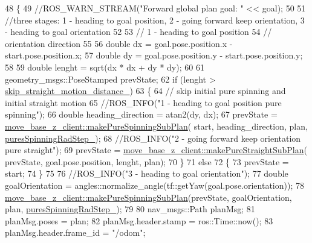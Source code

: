 \begin{DoxyCode}
48 \{
49     \textcolor{comment}{//ROS\_WARN\_STREAM("Forward global plan goal: " << goal);}
50 
51     \textcolor{comment}{//three stages: 1 - heading to goal position, 2 - going forward keep orientation, 3 - heading to goal
       orientation}
52 
53     \textcolor{comment}{// 1 - heading to goal position}
54     \textcolor{comment}{// orientation direction}
55 
56     \textcolor{keywordtype}{double} dx = goal.pose.position.x - start.pose.position.x;
57     \textcolor{keywordtype}{double} dy = goal.pose.position.y - start.pose.position.y;
58 
59     \textcolor{keywordtype}{double} lenght = sqrt(dx * dx + dy * dy);
60 
61     geometry\_msgs::PoseStamped prevState;
62     \textcolor{keywordflow}{if} (lenght > \hyperlink{classmove__base__z__client_1_1forward__global__planner_1_1ForwardGlobalPlanner_ae33082b9dd81dd3ce8d3e68a6c032c61}{skip\_straight\_motion\_distance\_})
63     \{
64         \textcolor{comment}{// skip initial pure spinning and initial straight motion}
65         \textcolor{comment}{//ROS\_INFO("1 - heading to goal position pure spinning");}
66         \textcolor{keywordtype}{double} heading\_direction = atan2(dy, dx);
67         prevState = \hyperlink{namespacemove__base__z__client_a01da021a9b88189c076e8740d5d2dfe5}{move\_base\_z\_client::makePureSpinningSubPlan}(
      start, heading\_direction, plan, \hyperlink{classmove__base__z__client_1_1forward__global__planner_1_1ForwardGlobalPlanner_a91bac0160c7b6ea54f4188b60f7fcf89}{puresSpinningRadStep\_});
68         \textcolor{comment}{//ROS\_INFO("2 - going forward keep orientation pure straight");}
69         prevState = \hyperlink{namespacemove__base__z__client_aeda8dd87896b3e31221df66d02313358}{move\_base\_z\_client::makePureStraightSubPlan}(
      prevState, goal.pose.position, lenght, plan);
70     \}
71     \textcolor{keywordflow}{else}
72     \{
73         prevState = start;
74     \}
75 
76     \textcolor{comment}{//ROS\_INFO("3 - heading to goal orientation");}
77     \textcolor{keywordtype}{double} goalOrientation = angles::normalize\_angle(tf::getYaw(goal.pose.orientation));
78     \hyperlink{namespacemove__base__z__client_a01da021a9b88189c076e8740d5d2dfe5}{move\_base\_z\_client::makePureSpinningSubPlan}(prevState, 
      goalOrientation, plan, \hyperlink{classmove__base__z__client_1_1forward__global__planner_1_1ForwardGlobalPlanner_a91bac0160c7b6ea54f4188b60f7fcf89}{puresSpinningRadStep\_});
79 
80     nav\_msgs::Path planMsg;
81     planMsg.poses = plan;
82     planMsg.header.stamp = ros::Time::now();
83     planMsg.header.frame\_id = \textcolor{stringliteral}{"/odom"};

\end{DoxyCode}
